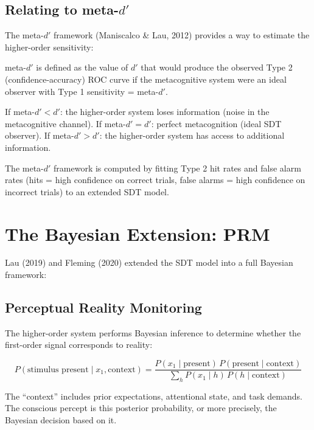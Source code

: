 \documentclass[11pt,a4paper]{report}
\begin{document}
\subsection{Relating to meta-$d'$}

The meta-$d'$ framework (Maniscalco \& Lau, 2012) provides a way to estimate the higher-order sensitivity:

\begin{mathbox}
\vspace{-6pt}
meta-$d'$ is defined as the value of $d'$ that would produce the observed Type 2 (confidence-accuracy) ROC curve if the metacognitive system were an ideal observer with Type 1 sensitivity = meta-$d'$.

If meta-$d' < d'$: the higher-order system loses information (noise in the metacognitive channel).
If meta-$d' = d'$: perfect metacognition (ideal SDT observer).
If meta-$d' > d'$: the higher-order system has access to additional information.
\vspace{-4pt}
\end{mathbox}

The meta-$d'$ framework is computed by fitting Type 2 hit rates and false alarm rates (hits = high confidence on correct trials, false alarms = high confidence on incorrect trials) to an extended SDT model.

\section{The Bayesian Extension: PRM}

Lau (2019) and Fleming (2020) extended the SDT model into a full Bayesian framework:

\subsection{Perceptual Reality Monitoring}

The higher-order system performs Bayesian inference to determine whether the first-order signal corresponds to reality:

\begin{mathbox}
\vspace{-6pt}
\[
  P(\text{stimulus present} \mid x_1, \text{context}) = \frac{P(x_1 \mid \text{present})\, P(\text{present} \mid \text{context})}{\sum_h P(x_1 \mid h)\, P(h \mid \text{context})}
\]
\vspace{-8pt}
\end{mathbox}

The ``context'' includes prior expectations, attentional state, and task demands. The conscious percept is this posterior probability, or more precisely, the Bayesian decision based on it.
\end{document}
